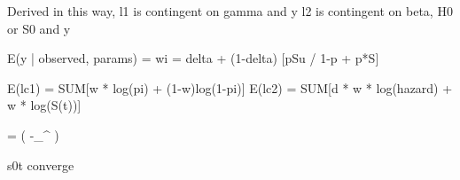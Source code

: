 Derived in this way, l1 is contingent on gamma and y
l2 is contingent on beta, H0 or S0 and y

E(y | observed, params) =  wi = delta + (1-delta) [pSu / 1-p + p*S]

E(lc1) = SUM[w * log(pi) + (1-w)log(1-pi)]
E(lc2) = SUM[d * w * log(hazard) + w * log(S(t))] %


	

	\sohat = \exp\bigg(
	-\sum_{}^{}
	)
	
	s0t converge